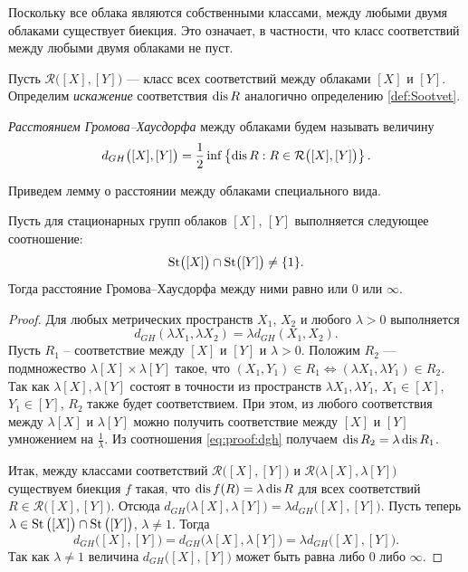 \begin{remark} Поскольку все облака являются собственными классами, между
  любыми двумя облаками существует биекция. Это означает, в
  частности, что класс соответствий между любыми двумя облаками не пуст.
\end{remark}
\begin{definition}
  Пусть $\mathcal{R}\big([X],[Y]\big)$ --- класс всех соответствий между
  облаками $[X]$ и $[Y]$. Определим \emph{искажение} соответствия $\operatorname{dis} R$
  аналогично определению \ref{def:Sootvet}.

  \emph{Расстоянием  Громова--Хаусдорфа} между облаками
  будем называть величину
  \[
    d_{GH}\big([X],[Y]\big) = \frac{1}{2}\inf\left\{\operatorname{dis} R : R\in
    \mathcal{R}\big([X],[Y]\big)\right\}.
  \]
\end{definition}
Приведем лемму о расстоянии между облаками специального вида.
\begin{lemma}
  Пусть для стационарных групп облаков \( [X] \), \( [Y] \)
  выполняется следующее соотношение:
  \[
    \operatorname{St} \bigl([X]\bigr) \cap \operatorname{St} \bigl([Y]\bigr) \neq \{1\}.
  \]
  Тогда расстояние Громова--Хаусдорфа между ними равно или \( 0 \)
  или \( \infty \).
  \label{lemmaDist}
\end{lemma}
\begin{proof}
  Для любых метрических пространств \( X_1 \), \( X_2 \) и любого \(
  \lambda > 0 \) выполняется
  \begin{equation}
    d_{GH}(\lambda X_1, \lambda X_2)  = \lambda d_{GH}(X_1, X_2).
    \label{eq:proof:dgh}
  \end{equation}
  Пусть \( R_1 \) -- соответствие между \([X]\) и \( [Y] \) и \(
  \lambda > 0 \). Положим
  \( R_2 \) --- подмножество \( \lambda [X] \times \lambda [Y]
  \) такое, что \( (X_1, Y_1) \in R_1 \iff (\lambda X_1, \lambda Y_1)
  \in R_2 \). Так как \( \lambda [X], \lambda [Y] \) состоят в
  точности из пространств \( \lambda X_1, \lambda Y_1 \), \( X_1 \in
  [X] \), \( Y_1 \in [Y] \), \( R_2 \) также будет соответствием. При
  этом, из любого соответствия между \( \lambda [X] \) и \( \lambda [Y] \) можно
  получить соответствие между \( [X] \) и \( [Y] \) умножением на \(
  \frac 1 \lambda \). Из соотношения \ref{eq:proof:dgh} получаем \(
  \operatorname{dis} R_2 = \lambda \operatorname{dis} R_1 \).

  Итак, между классами соответствий \( \mathcal{R}\big([X],[Y]\big)
  \) и \( \mathcal{R}\big(\lambda [X], \lambda [Y]\big) \) существуем
  биекция \( f \) такая, что \( \operatorname{dis} f(R) = \lambda \operatorname{dis} R \) для
  всех соответствий \( R \in \mathcal{R}\big([X],[Y]\big) \). Отсюда
  \( d_{GH}\big(\lambda [X], \lambda [Y]\big) = \lambda
  d_{GH}\big([X], [Y]\big) \). Пусть теперь \( \lambda \in
  \operatorname{St}\big([X]\big)\cap \operatorname{St}\big([Y]\big) \), \( \lambda \neq 1 \). Тогда
  \[
    d_{GH}\big([X],[Y]\big) = d_{GH}\big(\lambda [X], \lambda [Y]\big) = \lambda
    d_{GH}\big([X], [Y]\big).
  \]
  Так как \( \lambda \neq 1 \) величина \( d_{GH}\big([X], [Y]\big)\)
  может быть равна либо \( 0 \) либо \( \infty \).
\end{proof}
